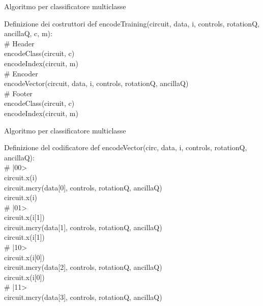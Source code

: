 \documentclass{beamer}
\begin{document}
    \begin{frame}{Algoritmo per classificatore multiclasse}
        \begin{block}{Definizione dei costruttori}
            def encodeTraining(circuit, data, i, controls, rotationQ, ancillaQ, c, m): \\
            \# Header \\
            encodeClass(circuit, c) \\
            encodeIndex(circuit, m) \\
            \# Encoder \\
            encodeVector(circuit, data, i, controls, rotationQ, ancillaQ) \\
            \# Footer \\
            encodeClass(circuit, c) \\
            encodeIndex(circuit, m)
        \end{block}
    \end{frame}

    \begin{frame}{Algoritmo per classificatore multiclasse}
        \begin{block}{Definizione del codificatore}
            def encodeVector(circ, data, i, controls, rotationQ, ancillaQ): \\
            \# |00>\\
            circuit.x(i)\\
            circuit.mcry(data[0], controls, rotationQ, ancillaQ)\\
            circuit.x(i)\\
            \# |01>\\
            circuit.x(i[1])\\
            circuit.mcry(data[1], controls, rotationQ, ancillaQ)\\
            circuit.x(i[1])\\
            \# |10>\\
            circuit.x(i[0])\\
            circuit.mcry(data[2], controls, rotationQ, ancillaQ)\\
            circuit.x(i[0])\\
            \# |11>\\
            circuit.mcry(data[3], controls, rotationQ, ancillaQ)
        \end{block}
    \end{frame}
\end{document}
